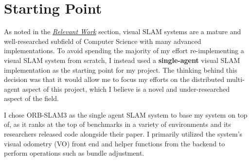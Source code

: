 




\label{sec:2}

\section{Starting Point}
\label{sec:starting-point}
As noted in the \hyperref[sec:relevant-work]{\textit{Relevant Work}} section, visual SLAM systems are a mature and well-researched subfield of Computer Science with many advanced implementations. To avoid spending the majority of my effort re-implementing a visual SLAM system from scratch, I instead used a \textbf{single-agent} visual SLAM implementation as the starting point for my project. The thinking behind this decision was that it would allow me to focus my efforts on the distributed multi-agent aspect of this project, which I believe is a novel and under-researched aspect of the field.

I chose ORB-SLAM3 as the single agent SLAM system to base my system on top of, as it ranks at the top of benchmarks in a variety of environments \autocite{DBLP:journals/corr/abs-2108-01654} and its researchers released code alongside their paper. I primarily utilized the system's visual odometry (VO) front end and helper functions from the backend to perform operations such as bundle adjustment.

